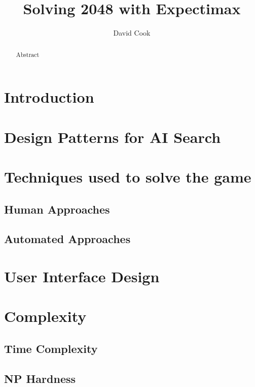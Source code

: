 \documentclass{article}
\title{Solving 2048 with Expectimax}
\author{David Cook}
\begin{document}
\maketitle

\tableofcontents

\begin{abstract}
Abstract
\end{abstract}

\section{Introduction}

\section{Design Patterns for AI Search}

\section{Techniques used to solve the game}
\subsection{Human Approaches}
\subsection{Automated Approaches}
\section{User Interface Design}
\section{Complexity}
\subsection{Time Complexity}
\subsection{NP Hardness}


\end{document}
